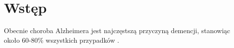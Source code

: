 \chapter*{Wstęp}

Obecnie choroba Alzheimera jest najczęstszą przyczyną demencji, stanowiąc około 60-80\% wszystkich przypadków \cite{what-is-alzheimers:2023}.
